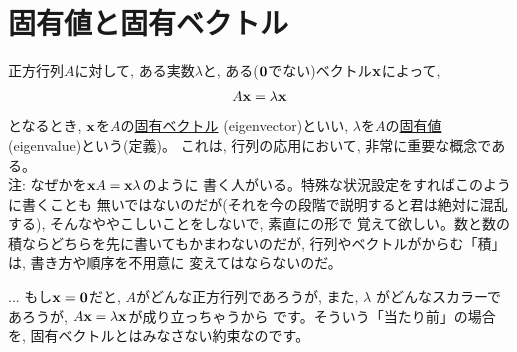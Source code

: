\section{固有値と固有ベクトル}

正方行列$A$に対して, ある実数$\lambda$と, ある(${\bf 0}$でない)ベクトル${\bf x}$によって, 
\begin{eqnarray}
A{\bf x}=\lambda {\bf x}\label{eq:def_eigenvec}
\end{eqnarray}
となるとき, ${\bf x}$を$A$の\underline{固有ベクトル} (eigenvector)といい, 
$\lambda$を$A$の\underline{固有値} (eigenvalue)という(定義)。
これは, 行列の応用において, 非常に重要な概念である。\\

{\small 注: なぜかを${\bf x}A={\bf x}\lambda$のように
書く人がいる。特殊な状況設定をすればこのように書くことも
無いではないのだが(それを今の段階で説明すると君は絶対に混乱する), 
そんなややこしいことをしないで, 素直にの形で
覚えて欲しい。数と数の積ならどちらを先に書いてもかまわないのだが, 
行列やベクトルがからむ「積」は, 書き方や順序を不用意に
変えてはならないのだ。}

\begin{faq}{\small{}
... もし${\bf x}={\bf 0}$だと, $A$がどんな正方行列であろうが, また, $\lambda$
がどんなスカラーであろうが, $A{\bf x}=\lambda{\bf x}$が成り立っちゃうから
です。そういう「当たり前」の場合を, 固有ベクトルとはみなさない約束なのです。}\end{faq}

